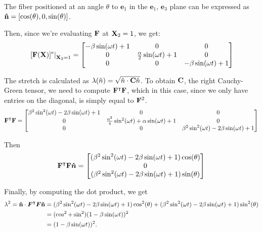 The fiber positioned at an angle $\theta$ to $\bm{e}_1$ in the $\bm{e}_1$, $\bm{e}_3$ plane can be expressed as $\mathbf{\hat{n}} = [\cos(\theta), 0, \sin(\theta)]$.

Then, since we're evaluating $\mathbf{F}$ at $\mathbf{X}_2 = 1$, we get:
\begin{equation*}
 \left. [\mathbf{F} (\mathbf{X})] ^e \right\rvert_{\mathbf{X}_2 = 1} =   
\begin{bmatrix}
-\beta \sin (\omega t) + 1 & 0 & 0\\
0 & \frac{\alpha}{2} \sin (\omega t) +1 & 0\\
0 & 0 & -\beta \sin (\omega t) + 1
\end{bmatrix}
\end{equation*}

The stretch is calculated as $\lambda(\hat{n}) = \sqrt{\hat{n} \cdot \mathbf{C} \hat{n}}$. To obtain $\mathbf{C}$, the right Cauchy-Green tensor, we need to compute $\mathbf{F}^\intercal \mathbf{F}$, which in this case, since we only have entries on the diagonal, is simply equal to $\mathbf{F}^2$.
\begin{equation*}
 \mathbf{F}^\intercal \mathbf{F} =   
\begin{bmatrix}
\beta^2 \sin^2 (\omega t) - 2 \beta \sin (\omega t) + 1 & 0 & 0\\
0 & \frac{\alpha^2}{4} \sin^2 (\omega t) + \alpha \sin (\omega t) +1 & 0\\
0 & 0 & \beta^2 \sin^2 (\omega t) - 2 \beta \sin (\omega t) + 1
\end{bmatrix}
\end{equation*}

Then
\begin{equation*}
 \mathbf{F}^\intercal \mathbf{F} \bm{\hat{n}} =   
\begin{bmatrix}
(\beta^2 \sin^2 (\omega t) - 2 \beta \sin (\omega t) + 1) \cos(\theta) \\
0 \\
(\beta^2 \sin^2 (\omega t) - 2 \beta \sin (\omega t) + 1) \sin(\theta)
\end{bmatrix}
\end{equation*}

Finally, by computing the dot product, we get
\begin{align*}
    \lambda^2 = \mathbf{\hat{n}} \cdot \bm{F}^\intercal \bm{F} \mathbf{\hat{n}} &= (\beta^2 \sin^2 (\omega t) - 2 \beta \sin (\omega t) + 1) \cos^2 (\theta) + (\beta^2 \sin^2 (\omega t) - 2 \beta \sin (\omega t) + 1) \sin^2 (\theta)\\
    &= (\cos^2 + \sin^2)(1 - \beta \sin(\omega t))^2\\
    &= (1 - \beta \sin(\omega t))^2.
\end{align*}

